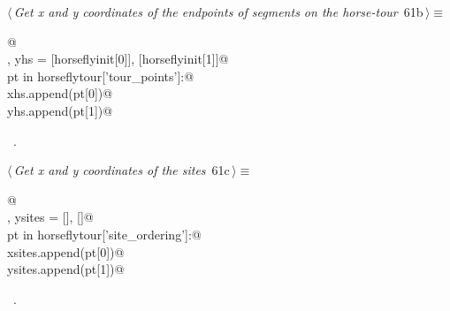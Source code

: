 \documentclass[11.5pt]{report}
\begin{document}
\vspace{-0.8cm} \newchunk
\begin{flushleft} \small
\begin{minipage}{\linewidth}\label{scrap84}\raggedright\small
{} $\langle\,${\itshape Get x and y coordinates of the endpoints of segments on the horse-tour}\nobreak\ {\footnotesize {61b}}$\,\rangle\equiv$
\vspace{-1ex}
\begin{list}{}{} \item
\mbox{}\verb@   @\\
\mbox{}\verb@xhs, yhs = [horseflyinit[0]], [horseflyinit[1]]@\\
\mbox{}\verb@for pt in horseflytour['tour_points']:@\\
\mbox{}\verb@    xhs.append(pt[0])@\\
\mbox{}\verb@    yhs.append(pt[1])@\\
\mbox{}\verb@@{\NWsep}
\end{list}
\vspace{-1.5ex}
\footnotesize
\begin{list}{}{\setlength{\itemsep}{-\parsep}\setlength{\itemindent}{-\leftmargin}}
\item \NWtxtMacroRefIn\ .

\item{}
\end{list}
\end{minipage}\vspace{4ex}
\end{flushleft}

\vspace{-0.8cm} \newchunk
\begin{flushleft} \small
\begin{minipage}{\linewidth}\label{scrap85}\raggedright\small
{} $\langle\,${\itshape Get x and y coordinates of the sites}\nobreak\ {\footnotesize {61c}}$\,\rangle\equiv$
\vspace{-1ex}
\begin{list}{}{} \item
\mbox{}\verb@   @\\
\mbox{}\verb@xsites, ysites = [], []@\\
\mbox{}\verb@for pt in horseflytour['site_ordering']:@\\
\mbox{}\verb@    xsites.append(pt[0])@\\
\mbox{}\verb@    ysites.append(pt[1])@\\
\mbox{}\verb@@{\NWsep}
\end{list}
\vspace{-1.5ex}
\footnotesize
\begin{list}{}{\setlength{\itemsep}{-\parsep}\setlength{\itemindent}{-\leftmargin}}
\item \NWtxtMacroRefIn\ .

\item{}
\end{list}
\end{minipage}\vspace{4ex}
\end{flushleft}
\end{document}
